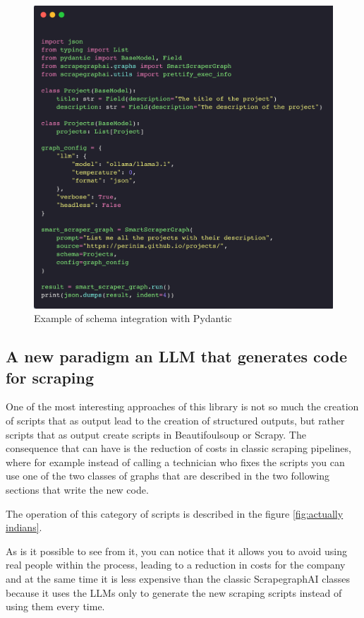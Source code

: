 \begin{figure}[h!]
    \centering
    \includegraphics[width=1\linewidth]{Assets/schema_integration.png}
    \caption{Example of schema integration with Pydantic}
    \label{fig:enter-label}
\end{figure}


\subsection{A new paradigm an LLM that generates code for scraping}
One of the most interesting approaches of this library is not so much the creation of scripts that as output lead to the creation of structured outputs, but rather scripts that as output create scripts in Beautifoulsoup or Scrapy.
The consequence that can have is the reduction of costs in classic scraping pipelines, where for example instead of calling a technician who fixes the scripts you can use one of the two classes of graphs that are described in the two following sections that write the new code.

The operation of this category of scripts is described in the figure \ref{fig:actually indians}.

As is it possible to see from it, you can notice that it allows you to avoid using real people within the process, leading to a reduction in costs for the company and at the same time it is less expensive than the classic ScrapegraphAI  classes because it uses the LLMs only to generate the new scraping scripts instead of using them every time.

